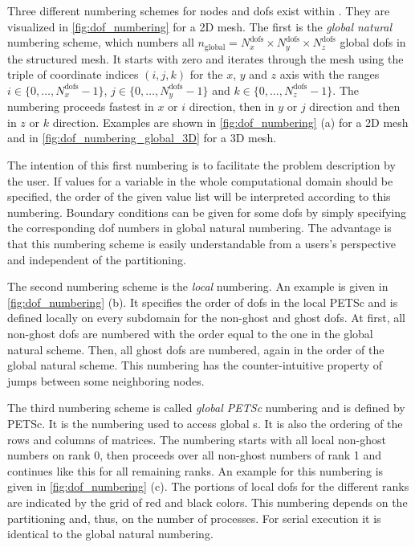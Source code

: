 Three different numbering schemes for nodes and dofs exist within \opendihu{}. They are visualized in \cref{fig:dof_numbering} for a 2D mesh. The first is the \emph{global natural} numbering scheme, which numbers all $n_\text{global} = N^\text{dofs}_x \times N^\text{dofs}_y \times N^\text{dofs}_z$ global dofs in the structured mesh. It starts with zero and iterates through the mesh using the triple of coordinate indices $(i,j,k)$ for the $x$, $y$ and $z$ axis with the ranges $i \in \{0,\dots,N^\text{dofs}_x-1\}$, $j \in \{0,\dots,N^\text{dofs}_y-1\}$ and $k \in \{0,\dots,N^\text{dofs}_z-1\}$. The numbering proceeds fastest in $x$ or $i$ direction, then in $y$ or $j$ direction and then in $z$ or $k$ direction. Examples are shown in \cref{fig:dof_numbering} (a) for a 2D mesh  and in \cref{fig:dof_numbering_global_3D} for a 3D mesh.

The intention of this first numbering is to facilitate the problem description by the user. If values for a variable in the whole computational domain should be specified, the order of the given value list will be interpreted according to this numbering. Boundary conditions can be given for some dofs by simply specifying the corresponding dof numbers in global natural numbering. The advantage is that this numbering scheme is easily understandable from a users's perspective and independent of the partitioning.

The second numbering scheme is the \emph{local} numbering. An example is given in \cref{fig:dof_numbering} (b). It specifies the order of dofs in the local PETSc \Vec{} and is defined locally on every subdomain for the non-ghost and ghost dofs. At first, all non-ghost dofs are numbered with the order equal to the one in the global natural scheme. Then, all ghost dofs are numbered, again in the order of the global natural scheme. This numbering has the counter-intuitive property of jumps between some neighboring nodes.

The third numbering scheme is called \emph{global PETSc} numbering and is defined by PETSc. It is the numbering used to access global \Vec{}s. It is also the ordering of the rows and columns of matrices. The numbering starts with all local non-ghost numbers on rank 0, then proceeds over all non-ghost numbers of rank 1 and continues like this for all remaining ranks. An example for this numbering is given in \cref{fig:dof_numbering} (c). The portions of local dofs for the different ranks are indicated by the grid of red and black colors. This numbering depends on the partitioning and, thus, on the number of processes. For serial execution it is identical to the global natural numbering.

